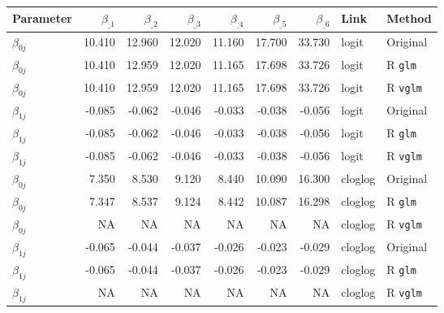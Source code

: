 
\begin{tabular}{lrrrrrrll}
\toprule
Parameter & $\beta_{\_1}$ & $\beta_{\_2}$ & $\beta_{\_3}$ & $\beta_{\_4}$ & $\beta_{\_5}$ & $\beta_{\_6}$ & Link & Method\\
\midrule
$\beta_{0j}$ & 10.410 & 12.960 & 12.020 & 11.160 & 17.700 & 33.730 & logit & Original \citep{candy1991modeling}\\
$\beta_{0j}$ & 10.410 & 12.959 & 12.020 & 11.165 & 17.698 & 33.726 & logit & R \verb+glm+\\
$\beta_{0j}$ & 10.410 & 12.959 & 12.020 & 11.165 & 17.698 & 33.726 & logit & R \verb+vglm+\\
\addlinespace
$\beta_{1j}$ & -0.085 & -0.062 & -0.046 & -0.033 & -0.038 & -0.056 & logit & Original \citep{candy1991modeling}\\
$\beta_{1j}$ & -0.085 & -0.062 & -0.046 & -0.033 & -0.038 & -0.056 & logit & R \verb+glm+\\
$\beta_{1j}$ & -0.085 & -0.062 & -0.046 & -0.033 & -0.038 & -0.056 & logit & R \verb+vglm+\\
\addlinespace
$\beta_{0j}$ & 7.350 & 8.530 & 9.120 & 8.440 & 10.090 & 16.300 & cloglog & Original \citep{candy1991modeling}\\
$\beta_{0j}$ & 7.347 & 8.537 & 9.124 & 8.442 & 10.087 & 16.298 & cloglog & R \verb+glm+\\
$\beta_{0j}$ & NA & NA & NA & NA & NA & NA & cloglog & R \verb+vglm+\\
\addlinespace
$\beta_{1j}$ & -0.065 & -0.044 & -0.037 & -0.026 & -0.023 & -0.029 & cloglog & Original \citep{candy1991modeling}\\
$\beta_{1j}$ & -0.065 & -0.044 & -0.037 & -0.026 & -0.023 & -0.029 & cloglog & R \verb+glm+\\
$\beta_{1j}$ & NA & NA & NA & NA & NA & NA & cloglog & R \verb+vglm+\\
\bottomrule
\end{tabular}
